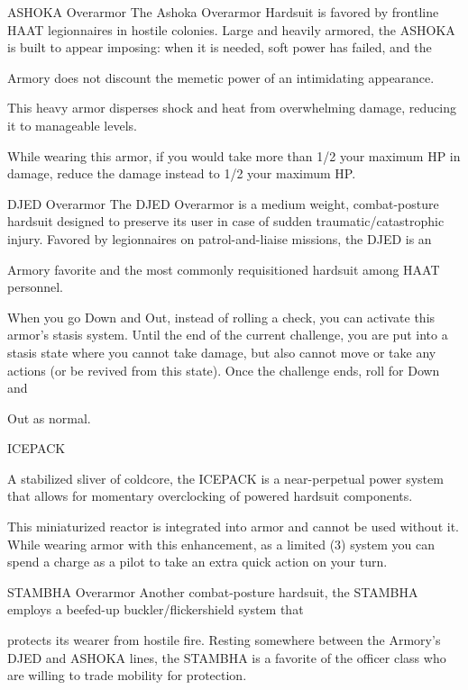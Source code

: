 ASHOKA Overarmor  
The Ashoka Overarmor Hardsuit is favored by frontline HAAT legionnaires in hostile colonies. Large and  
heavily armored, the ASHOKA is built to appear imposing: when it is needed, soft power has failed, and the  

Armory does not discount the memetic power of an intimidating appearance.   

This heavy armor disperses shock and heat from overwhelming damage, reducing it to manageable levels.  

While wearing this armor, if you would take more than 1/2 your maximum HP in damage, reduce the  
damage instead to 1/2 your maximum HP.
 

DJED Overarmor  
The DJED Overarmor is a medium weight, combat-posture hardsuit designed to preserve its user in case of  
sudden traumatic/catastrophic injury. Favored by legionnaires on patrol-and-liaise missions, the DJED is an  

Armory favorite and the most commonly requisitioned hardsuit among HAAT personnel.   

                                                                                                                      


When you go Down and Out, instead of rolling a check, you can activate this armor’s stasis system. Until  
the end of the current challenge, you are put into a stasis state where you cannot take damage, but also  
cannot move or take any actions (or be revived from this state). Once the challenge ends, roll for Down and  

Out as normal.
 

ICEPACK  

A stabilized sliver of coldcore, the ICEPACK is a near-perpetual power system that allows for momentary  
overclocking of powered hardsuit components.   

This miniaturized reactor is integrated into armor and cannot be used without it. While wearing armor with  
this enhancement, as a limited (3) system you can spend a charge as a pilot to take an extra quick action  
on your turn.
 

STAMBHA Overarmor  
Another combat-posture hardsuit, the STAMBHA employs a beefed-up buckler/flickershield system that  

protects its wearer from hostile fire. Resting somewhere between the Armory’s DJED and ASHOKA lines,  
the STAMBHA is a favorite of the officer class who are willing to trade mobility for protection.   

